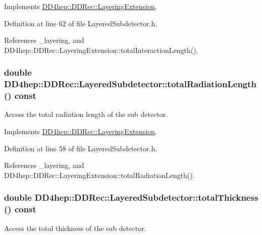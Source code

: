 Implements \hyperlink{class_d_d4hep_1_1_d_d_rec_1_1_layering_extension_aa5440bf9dc11305a785765ca155437fa}{DD4hep::DDRec::LayeringExtension}.

Definition at line 62 of file LayeredSubdetector.h.

References \_\-layering, and DD4hep::DDRec::LayeringExtension::totalInteractionLength().\hypertarget{class_d_d4hep_1_1_d_d_rec_1_1_layered_subdetector_ae33ee0ed3dc3c41b7449e950176d37c2}{
\subsubsection[{totalRadiationLength}]{\setlength{\rightskip}{0pt plus 5cm}double DD4hep::DDRec::LayeredSubdetector::totalRadiationLength () const}}
\label{class_d_d4hep_1_1_d_d_rec_1_1_layered_subdetector_ae33ee0ed3dc3c41b7449e950176d37c2}


Access the total radiation length of the sub detector. 

Implements \hyperlink{class_d_d4hep_1_1_d_d_rec_1_1_layering_extension_a710dca345926458ed3ab3abc06490ee9}{DD4hep::DDRec::LayeringExtension}.

Definition at line 58 of file LayeredSubdetector.h.

References \_\-layering, and DD4hep::DDRec::LayeringExtension::totalRadiationLength().\hypertarget{class_d_d4hep_1_1_d_d_rec_1_1_layered_subdetector_a3bfdb0cc2f8b907fe8fb505b778db042}{
\subsubsection[{totalThickness}]{\setlength{\rightskip}{0pt plus 5cm}double DD4hep::DDRec::LayeredSubdetector::totalThickness () const}}
\label{class_d_d4hep_1_1_d_d_rec_1_1_layered_subdetector_a3bfdb0cc2f8b907fe8fb505b778db042}


Access the total thickness of the sub detector. 

